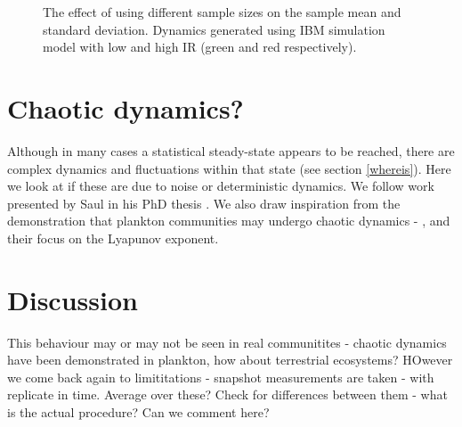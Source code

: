 \begin{figure}[hp]
	\centering
        \caption{The effect of using different sample sizes on the sample mean and standard deviation. Dynamics generated using IBM simulation model with low and high IR (green and red respectively).}    
    \label{fig:low_v_hi}
\end{figure}


\section{Chaotic dynamics?}
\label{sec:chaos}

Although in many cases a statistical steady-state appears to be reached, there are complex dynamics and fluctuations within that state (see section \ref{whereis}).  Here we look at if these are due to noise or deterministic dynamics. We follow work presented by Saul in his PhD thesis \cite{saul09phd}. We also draw inspiration from the demonstration that plankton communities may undergo chaotic dynamics - \cite{beninca2008chaos}, and their focus on the Lyapunov exponent.


\section{Discussion}

This behaviour may or may not be seen in real communitites - chaotic dynamics have been demonstrated in plankton, how about terrestrial ecosystems? HOwever we come back again to limititations - snapshot measurements are taken - with replicate in time. Average over these? Check for differences between them - what is the actual procedure? Can we comment here? 

